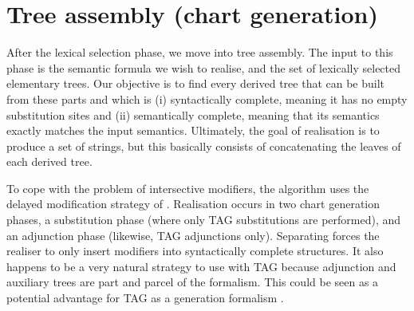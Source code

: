\section{Tree assembly (chart generation)}
\label{sec:geni-chart}

After the lexical selection phase, we move into tree assembly.  The
input to this phase is the semantic formula we wish to
realise, and the set of lexically selected elementary trees.  Our
objective is to find every derived tree that can be built from these
parts and which is (i) syntactically complete, meaning it has no empty 
substitution sites and (ii) semantically complete, meaning that its
semantics exactly matches the input semantics.  Ultimately, the goal
of realisation is to produce a set of strings, but this basically
consists of concatenating the leaves of each derived tree.

To cope with the problem of intersective modifiers, the algorithm uses
the delayed modification strategy of \cite{carroll1999ecg}.  Realisation
occurs in two chart generation phases, a substitution phase (where only
TAG substitutions are performed), and an adjunction phase (likewise, TAG
adjunctions only).  Separating forces the realiser to only insert
modifiers into syntactically complete structures.  It also happens to be
a very natural strategy to use with TAG because adjunction and auxiliary
trees are part and parcel of the formalism.  This could be seen as a
potential advantage for TAG as a generation formalism
\cite{gardent2005gas}.

